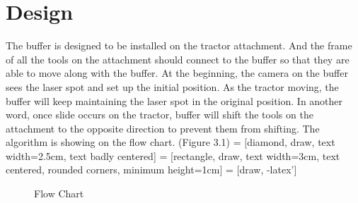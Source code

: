 \documentclass[letterpaper,12pt,oneside]{book}
\begin{document}
		\chapter{Design}
		The buffer is designed to be installed on the tractor attachment. And the frame of all the tools on the attachment should connect to the buffer so that they are able to move along with the buffer. At the beginning, the camera on the buffer sees the laser spot and set up the initial position. As the tractor moving, the buffer will keep maintaining the laser spot in the original position. In another word, once slide occurs on the tractor, buffer will shift the tools on the attachment to the opposite direction to prevent them from shifting. The algorithm is showing on the flow chart. (Figure 3.1)
		 = [diamond, draw, text width=2.5cm, text badly centered]
		 = [rectangle, draw, text width=3cm, text centered, rounded corners, minimum height=1cm]
		 = [draw, -latex']
		\begin{figure}
			\begin{center}
				\caption{Flow Chart}
			\end{center}
		\end{figure}
\end{document}
